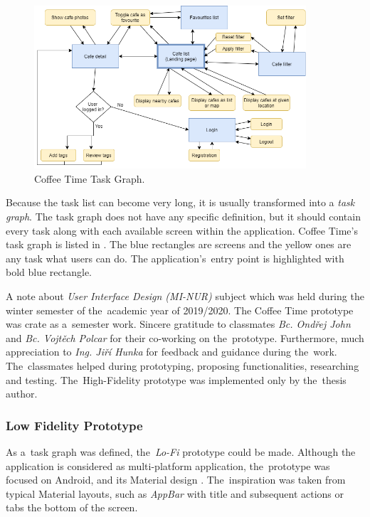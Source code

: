 \begin{figure}[htp]
    \centering
    \includegraphics[width=0.9\textwidth]{img/analysis/task-list-graph.png}
    \caption{Coffee Time Task Graph.}
    \label{fig:task-graph}
\end{figure}

Because the task list can become very long, it is usually transformed into a \textit{task graph}. The task graph does not have any specific definition, but it should contain every task along with each available screen within the application. Coffee Time's task graph is listed in . The blue rectangles are screens and the yellow ones are any task what users can do. The application's~entry point is highlighted with bold blue rectangle.

A note about \textit{User Interface Design (MI-NUR)} subject which was held during the winter semester of the~academic year of 2019/2020. The Coffee Time prototype was crate as a~semester work. Sincere gratitude to classmates \textit{Bc. Ondřej John} and \textit{Bc. Vojtěch Polcar} for their co-working on the~prototype. Furthermore, much appreciation to \textit{Ing. Jiří Hunka} for feedback and guidance during the~work. The~classmates helped during prototyping, proposing functionalities, researching and testing. The~High-Fidelity prototype was implemented only by the~thesis author. 

\subsubsection{Low Fidelity Prototype}
As a~task graph was defined, the~\textit{Lo-Fi} prototype could be made. Although the application is considered as multi-platform application, the~prototype was focused on Android, and its Material design \cite{material-design}. The~inspiration was taken from typical Material layouts, such as \textit{AppBar} with title and subsequent actions or tabs the bottom of the screen. 


